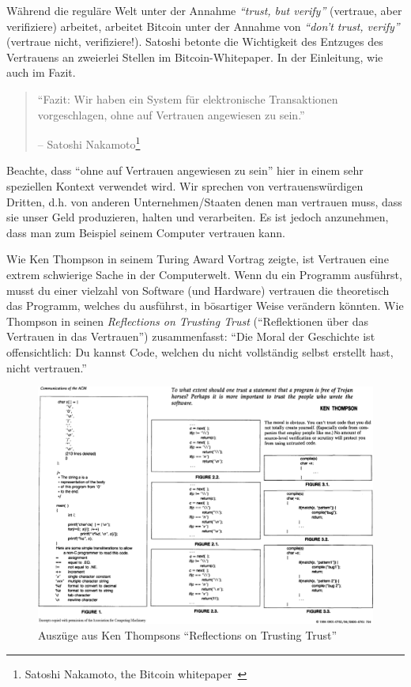 Während die reguläre Welt unter der Annahme \textit{\enquote{trust, but verify}}
(vertraue, aber verifiziere) arbeitet, arbeitet Bitcoin unter der Annahme von
\textit{\enquote{don’t trust, verify}} (vertraue nicht, verifiziere!). Satoshi
betonte die Wichtigkeit des Entzuges des Vertrauens an zweierlei Stellen im
Bitcoin-Whitepaper. In der Einleitung, wie auch im Fazit.

\begin{quotation}\begin{samepage}
\enquote{Fazit: Wir haben ein System für elektronische Transaktionen
vorgeschlagen, ohne auf Vertrauen angewiesen zu sein.}
\begin{flushright} -- Satoshi Nakamoto\footnote{Satoshi Nakamoto, the Bitcoin
whitepaper~\cite{whitepaper}}
\end{flushright}\end{samepage}\end{quotation}

Beachte, dass \enquote{ohne auf Vertrauen angewiesen zu sein} hier in einem sehr
speziellen Kontext verwendet wird. Wir sprechen von vertrauenswürdigen Dritten,
d.h. von anderen Unternehmen/Staaten denen man vertrauen muss, dass sie unser
Geld produzieren, halten und verarbeiten. Es ist jedoch anzunehmen, dass man zum
Beispiel seinem Computer vertrauen kann.

Wie Ken Thompson in seinem Turing Award Vortrag zeigte, ist Vertrauen eine extrem
schwierige Sache in der Computerwelt. Wenn du ein Programm ausführst, musst du
einer vielzahl von Software (und Hardware) vertrauen die theoretisch das
Programm, welches du ausführst, in bösartiger Weise verändern könnten. Wie
Thompson in seinen \textit{Reflections on Trusting Trust} (\enquote{Reflektionen
über das Vertrauen in das Vertrauen}) zusammenfasst: \enquote{Die Moral der
Geschichte ist offensichtlich: Du kannst Code, welchen du nicht vollständig
selbst erstellt hast, nicht vertrauen.}~\cite{trusting-trust}

\begin{figure}
  \includegraphics{assets/images/ken-thompson-hack.png}
  \caption{Auszüge aus Ken Thompsons \enquote{Reflections on Trusting Trust}}
  \label{fig:ken-thompson-hack}
\end{figure}

